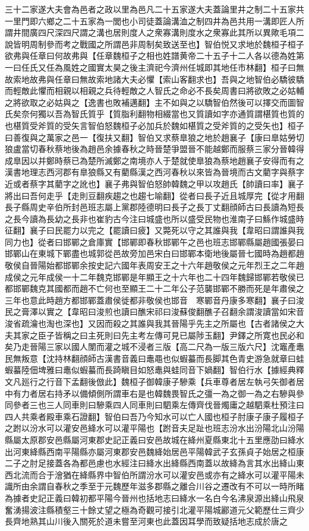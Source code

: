 三十二家遂大夫會為邑者之政以里為邑凡二十五家遂大夫蓋論里井之制二十五家共一里門即六鄉之二十五家為一閭也小司徒蓋論溝洫之制四井為邑共用一溝即匠人所謂井間廣四尺深四尺謂之溝也居則度人之衆寡溝則度水之衆寡此其所以異歟毛項二說皆明周制參而考之戰國之所謂邑非周制矣致送至也】智伯悦又求地於魏桓子桓子欲弗與任章曰何故弗與【任章魏桓子之相也姓譜黄帝二十五子十二人各以德為姓第一曰任氏又任為風姓之國實太昊之後主濟祀今濟州任城即其地任市林翻】桓子曰無故索地故弗與任章曰無故索地諸大夫必懼【索山客翻求也】吾與之地智伯必驕彼驕而輕敵此懼而相親以相親之兵待輕敵之人智氏之命必不長矣周書曰將欲敗之必姑輔之將欲取之必姑與之【逸書也敗補邁翻】主不如與之以驕智伯然後可以擇交而圖智氏矣奈何獨以吾為智氏質乎【質脂利翻物相綴當也又質讀如字亦通質謂椹質也質的也椹質受斧質的受矢言智伯怒魏桓子必加兵於魏如椹質之受斧質的之受矢也】桓子曰善復與之萬家之邑一【復扶又翻】智伯又求蔡臯狼之地於趙襄子【康曰臯姑勞切狼盧當切春秋蔡地後為趙邑余據春秋之時晉楚爭盟晉不能越鄭而服蔡三家分晉韓得成臯因以并鄭時蔡已為楚所滅鄭之南境亦人于楚就使臯狼為蔡地趙襄子安得而有之漢書地理志西河郡有臯狼縣又有藺縣漢之西河春秋以來皆為晉境而古文藺字與蔡字近或者蔡字其藺字之訛也】襄子弗與智伯怒帥韓魏之甲以攻趙氏【帥讀曰率】襄子將出曰吾何走乎【走則豆翻疾趨之也趨七喻翻】從者曰長子近且城厚完【從才用翻長子縣周史辛伯所封邑班志屬上黨郡陸德明曰長子之長丁丈翻顔師古曰長讀為短長之長今讀為長幼之長非也崔豹古今注曰城盛也所以盛受民物也淮南子曰鯀作城盛時征翻】襄子曰民罷力以完之【罷讀曰疲】又斃死以守之其誰與我【韋昭曰謂誰與我同力也】從者曰邯鄲之倉庫實【邯鄲即春秋邯鄲午之邑也班志邯鄲縣屬趙國張晏曰邯鄲山在東城下鄲盡也城郭從邑故旁加邑宋白曰邯鄲本衛地後屬晉七國時為趙都趙敬侯自晉陽始都邯鄲余按史記六國年表周安王之十六年趙敬侯之元年烈王之二年趙成侯之元年成侯一十二年魏克邯鄲是年顯王之十六年也二十四年魏歸邯鄲若敬侯已都邯鄲魏克其國都而趙不亡何也至顯王二十二年公子范襲邯鄲不勝而死是年肅侯之三年也意此時趙方都邯鄲蓋肅侯徙都非敬侯也邯音　寒鄲音丹康多寒翻】襄子曰浚民之膏澤以實之【韋昭曰浚煎也讀曰醮宋祁曰浚蘇俊翻醮子召翻余謂浚讀當如宋音浚省疏瀹也淘也深也】又因而殺之其誰與我其晉陽乎先主之所屬也【古者諸侯之大夫其家之臣子皆稱之曰主死則曰先主考左傳可見已屬陟玉翻】尹鐸之所寛也民必和矣乃走晉陽三家以國人闈而灌之城不浸者三版【高二尺為一版三版六尺】沈竈產鼃民無叛意【沈持林翻顔師古漢書音義曰鼃黽也似蝦蟇而長脚其色青史游急就章曰蛙蝦蟇陸佃埤雅曰鼃似蝦蟇而長踦瞋目如怒鼃與蛙同音下媧翻】智伯行水【據經典釋文凡廵行之行音下孟翻後倣此】魏桓子御韓康子驂乘【兵車尊者居左執弓矢御者居中有力者居右持矛以備傾側所謂車右是也韓魏畏智氏之彊一為之御一為之右驂與參同參者三也三人同車則曰驂乘四人同車則曰駟乘左傳齊伐晉燭庸之越駟乘杜預注曰四人共乘者殿車乘石證翻】智伯曰吾乃今知水可以亡人國也桓子肘康子康子履桓子之跗以汾水可以灌安邑絳水可以灌平陽也【跗音夫足趾也班志汾水出汾陽北山汾陽縣屬太原郡安邑縣屬河東郡史記正義曰安邑故城在絳州夏縣東北十五里應劭曰絳水出河東絳縣西南平陽縣亦屬河東郡安邑魏絳始居邑平陽韓武子玄孫貞子始居之桓康二子之肘足接蓋各為都邑慮也水經注曰絳水出絳縣西南蓋以故絳為言其水出絳山東西北流而合于澮猶在絳縣界中智伯所謂汾水可以灌安邑或亦有之絳水可以灌平陽未識所由余謂自春秋之季至于元魏歷年滋多郡縣之離合川谷之遷改有不可以一時所睹為據者史記正義曰韓初都平陽今晉州也括地志曰絳水一名白今名沸泉源出絳山飛泉奮湧揚波注縣積壑三十餘丈望之極為奇觀可接引北灌平陽城酈道元父範歷仕三齊少長齊地熟其山川後入關死於道未嘗至河東也此蓋因耳學而致疑括地志成於唐之